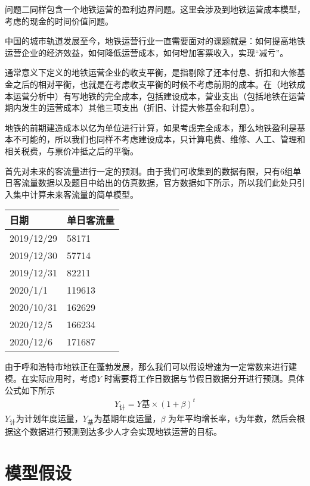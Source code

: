 \documentclass[12pt,a4paper]{mcmthesis}
\begin{document}
{问题二同样包含一个地铁运营的盈利边界问题。这里会涉及到地铁运营成本模型，考虑的现金的时间价值问题。}
{中国的城市轨道发展至今，地铁运营行业一直需要面对的课题就是：如何提高地铁运营企业的经济效益，如何降低运营成本，如何增加客票收入，实现“减亏”。
	
通常意义下定义的地铁运营企业的收支平衡，是指剔除了还本付息、折扣和大修基金之后的相对平衡，也就是在考虑收支平衡的时候不考虑前期的成本。在（地铁成本运营分析中）有写地铁的完全成本，包括建设成本，营业支出（包括地铁在运营期内发生的运营成本）其他三项支出（折旧、计提大修基金和利息）。

地铁的前期建造成本以亿为单位进行计算，如果考虑完全成本，那么地铁盈利是基本不可能的，所以我们也同样不考虑建设成本，只计算电费、维修、人工、管理和相关税费，与票价冲抵之后的平衡。}

 {首先对未来的客流量进行一定的预测。由于我们可收集到的数据有限，只有6组单日客流量数据以及题目中给出的仿真数据，官方数据如下所示，所以我们此处只引入集中计算未来客流量的简单模型。}
\begin{table}
    \centering
    \begin{tabular}{|l|l|}
    \hline
        日期 & 单日客流量 \\ \hline
        2019/12/29 & 58171 \\ \hline
        2019/12/30 & 57714 \\ \hline
        2019/12/31 & 82211 \\ \hline
        2020/1/1 & 119613 \\ \hline
        2020/10/31 & 162629 \\ \hline
        2020/12/5 & 166234 \\ \hline
        2020/12/6 & 171687 \\ \hline
    \end{tabular}
\end{table}
    由于呼和浩特市地铁正在蓬勃发展，那么我们可以假设增速为一定常数来进行建模。在实际应用时，考虑$Y$ 时需要将工作日数据与节假日数据分开进行预测。具体公式如下所示
    \begin{equation}
        \begin{aligned}
            Y_{计}=Y{基} \times (1+\beta)^t
            \end{aligned}
    \end{equation}
    $Y_{计}$为计划年度运量，$Y_{基}$为基期年度运量，$\beta$ 为年平均增长率，t为年数，然后会根据这个数据进行预测到达多少人才会实现地铁运营的目标。




\section{模型假设}
\end{document}
